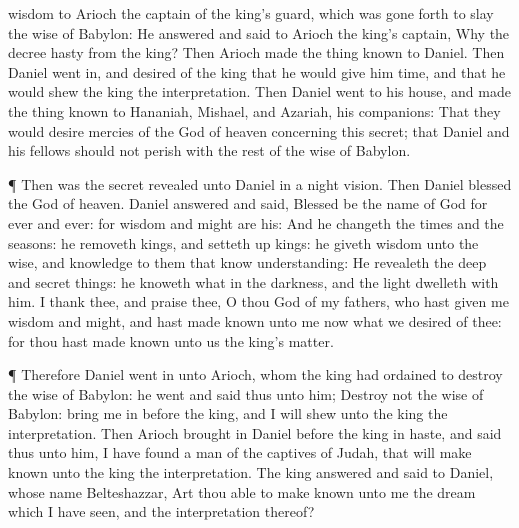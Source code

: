 {wisdom to
Arioch the
captain
of the
king’s
guard, which was gone
forth to
slay the
wise
{} of
Babylon:
He
answered and
said to
Arioch the
king’s
captain,
Why
{} the
decree
{}
hasty
from the
king?
Then
Arioch made the
thing
known to
Daniel.
Then
Daniel went
in, and
desired
of the
king that he would
give him
time, and that he would
shew the
king the
interpretation.
Then
Daniel
went to his
house, and made the
thing
known to
Hananiah,
Mishael, and
Azariah, his
companions:
That they would
desire
mercies
of the
God of
heaven
concerning
this
secret; that
Daniel and his
fellows should
not
perish
with the
rest of the
wise
{} of
Babylon.
\par }{\PP {}¶
Then was the
secret
revealed unto
Daniel in a
night
vision.
Then
Daniel
blessed the
God of
heaven.
Daniel
answered and
said,
Blessed
be the
name of
God
for
ever and
ever: for
wisdom and
might
are his:
And he
changeth the
times and the
seasons: he
removeth
kings, and setteth
up
kings: he
giveth
wisdom unto the
wise, and
knowledge to them that
know
understanding:
He
revealeth the
deep and secret
things: he
knoweth
what
{} in the
darkness, and the
light
dwelleth with
him.
I
thank thee, and
praise thee, O thou
God of my
fathers, who hast
given me
wisdom and
might, and hast made
known unto me
now what we
desired of
thee: for thou hast
{} made
known unto us the
king’s
matter.
\par }{\PP {}¶
Therefore
Daniel went
in
unto
Arioch, whom the
king had
ordained to
destroy the
wise
{} of
Babylon: he
went and
said
thus unto him;
Destroy
not the
wise
{} of
Babylon: bring me
in
before the
king, and I will
shew unto the
king the
interpretation.
Then
Arioch brought
in
Daniel
before the
king in
haste, and
said
thus unto him, I have
found a
man of the
captives
of
Judah, that will make
known unto the
king the
interpretation.
The
king
answered and
said to
Daniel, whose
name
{}
Belteshazzar,
Art thou
able to make
known unto me the
dream which I have
seen, and the
interpretation thereof?
}
